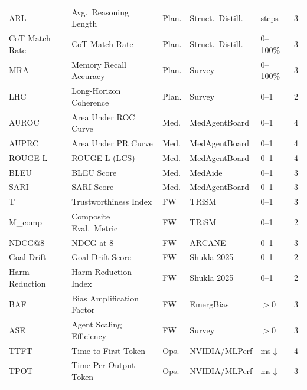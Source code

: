 \documentclass[11pt,a4paper]{article}
\begin{document}
\begin{longtable}{p{1.8cm}p{3.5cm}p{1.2cm}p{1.8cm}p{1.0cm}c}
  ARL            & Avg.\ Reasoning Length         & Plan.   & Struct.\ Distill. & steps      & 3 \\
  CoT Match Rate & CoT Match Rate                 & Plan.   & Struct.\ Distill. & 0--100\%   & 3 \\
  MRA            & Memory Recall Accuracy         & Plan.   & Survey            & 0--100\%   & 3 \\
  LHC            & Long-Horizon Coherence         & Plan.   & Survey            & 0--1       & 2 \\
  \midrule
  AUROC          & Area Under ROC Curve           & Med.    & MedAgentBoard     & 0--1       & 4 \\
  AUPRC          & Area Under PR Curve            & Med.    & MedAgentBoard     & 0--1       & 4 \\
  ROUGE-L        & ROUGE-L (LCS)                  & Med.    & MedAgentBoard     & 0--1       & 4 \\
  BLEU           & BLEU Score                     & Med.    & MedAide           & 0--1       & 3 \\
  SARI           & SARI Score                     & Med.    & MedAgentBoard     & 0--1       & 3 \\
  \midrule
  T              & Trustworthiness Index          & FW      & TRiSM             & 0--1       & 3 \\
  M\_comp        & Composite Eval.\ Metric        & FW      & TRiSM             & 0--1       & 2 \\
  NDCG@8         & NDCG at 8                      & FW      & ARCANE            & 0--1       & 3 \\
  Goal-Drift     & Goal-Drift Score               & FW      & Shukla 2025       & 0--1       & 2 \\
  Harm-Reduction & Harm Reduction Index           & FW      & Shukla 2025       & 0--1       & 2 \\
  BAF            & Bias Amplification Factor      & FW      & EmergBias         & $>0$       & 3 \\
  ASE            & Agent Scaling Efficiency       & FW      & Survey            & $>0$       & 3 \\
  \midrule
  TTFT           & Time to First Token            & Ops.    & NVIDIA/MLPerf     & ms$\downarrow$ & 4 \\
  TPOT           & Time Per Output Token          & Ops.    & NVIDIA/MLPerf     & ms$\downarrow$ & 3 \\

\end{longtable}
\end{document}

